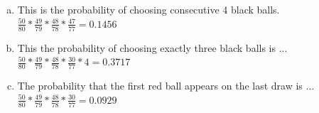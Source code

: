 \documentclass[10pt]{report}
\begin{document}
\subsection{}
 \begin{enumerate}[(a)]
 \item This is the probability of choosing consecutive 4 black balls.
\ \\
$\frac{50}{80} * \frac{49}{79} * \frac{48}{78} *\frac{47}{77} = \mathbf{0.1456} $
\item This the probability of choosing exactly three black balls is ... \ \\
$\frac{50}{80} * \frac{49}{79} * \frac{48}{78} * \frac{30}{77} * 4 = \mathbf{0.3717} $
\item The probability that the first red ball appears on the last draw is ... 
\ \\
$\frac{50}{80} * \frac{49}{79} * \frac{48}{78} * \frac{30}{77} =\mathbf{0.0929} $
 \end{enumerate}
\end{document}
